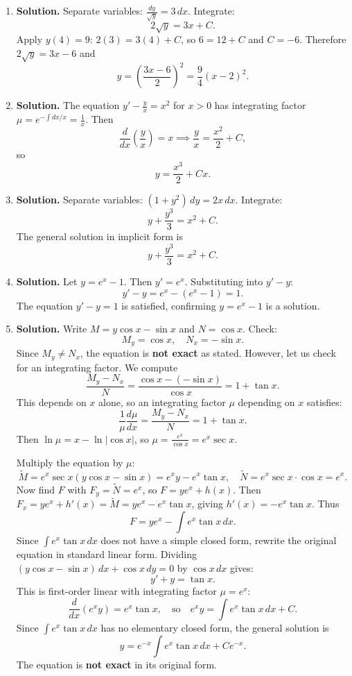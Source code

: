 \begin{enumerate}
\item \textbf{Solution.}
Separate variables: $\frac{dy}{\sqrt{y}}=3\,dx$. Integrate:
\[
2\sqrt{y}=3x+C.
\]
Apply $y(4)=9$: $2(3)=3(4)+C$, so $6=12+C$ and $C=-6$. Therefore $2\sqrt{y}=3x-6$ and
\[
\boxed{y = \left(\frac{3x-6}{2}\right)^2 = \frac{9}{4}(x-2)^2}.
\]

\item \textbf{Solution.}
The equation $y'-\frac{y}{x}=x^2$ for $x>0$ has integrating factor $\mu=e^{-\int dx/x}=\frac{1}{x}$. Then
\[
\frac{d}{dx}\!\left(\frac{y}{x}\right)=x \implies \frac{y}{x}=\frac{x^2}{2}+C,
\]
so
\[
\boxed{y = \frac{x^3}{2}+Cx}.
\]

\item \textbf{Solution.}
Separate variables: $(1+y^2)\,dy = 2x\,dx$. Integrate:
\[
y+\frac{y^3}{3}=x^2+C.
\]
The general solution in implicit form is
\[
\boxed{y+\frac{y^3}{3}=x^2+C}.
\]

\item \textbf{Solution.}
Let $y=e^x-1$. Then $y'=e^x$. Substituting into $y'-y$:
\[
y'-y = e^x-(e^x-1)=1.\]
The equation $y'-y=1$ is satisfied, confirming $y=e^x-1$ is a solution.

\item \textbf{Solution.}
Write $M=y\cos x-\sin x$ and $N=\cos x$. Check:
\[
M_y=\cos x, \quad N_x=-\sin x.
\]
Since $M_y\neq N_x$, the equation is \textbf{not exact} as stated. However, let us check for an integrating factor. We compute
\[
\frac{M_y-N_x}{N}=\frac{\cos x-(-\sin x)}{\cos x}=1+\tan x.
\]
This depends on $x$ alone, so an integrating factor $\mu$ depending on $x$ satisfies:
\[
\frac{1}{\mu}\frac{d\mu}{dx}=\frac{M_y-N_x}{N}=1+\tan x.
\]
Then $\ln\mu = x-\ln|\cos x|$, so $\mu = \frac{e^x}{\cos x}=e^x\sec x$.

Multiply the equation by $\mu$:
\[
\widetilde{M}=e^x\sec x(y\cos x-\sin x)=e^x y - e^x\tan x, \quad \widetilde{N}=e^x\sec x\cdot\cos x = e^x.
\]
Now find $F$ with $F_y=\widetilde{N}=e^x$, so $F=ye^x+h(x)$. Then $F_x=ye^x+h'(x)=\widetilde{M}=ye^x-e^x\tan x$, giving $h'(x)=-e^x\tan x$. Thus
\[
F = ye^x - \int e^x\tan x\,dx.
\]
Since $\int e^x\tan x\,dx$ does not have a simple closed form, rewrite the original equation in standard linear form. Dividing $(y\cos x - \sin x)\,dx + \cos x\,dy = 0$ by $\cos x\,dx$ gives:
\[
y' + y = \tan x.
\]
This is first-order linear with integrating factor $\mu = e^x$:
\[
\frac{d}{dx}(e^x y) = e^x\tan x, \quad\text{so}\quad e^x y = \int e^x \tan x\,dx + C.
\]
Since $\int e^x \tan x\,dx$ has no elementary closed form, the general solution is
\[
\boxed{y = e^{-x}\int e^x \tan x\,dx + Ce^{-x}}.
\]
The equation is \textbf{not exact} in its original form.


\end{enumerate}
